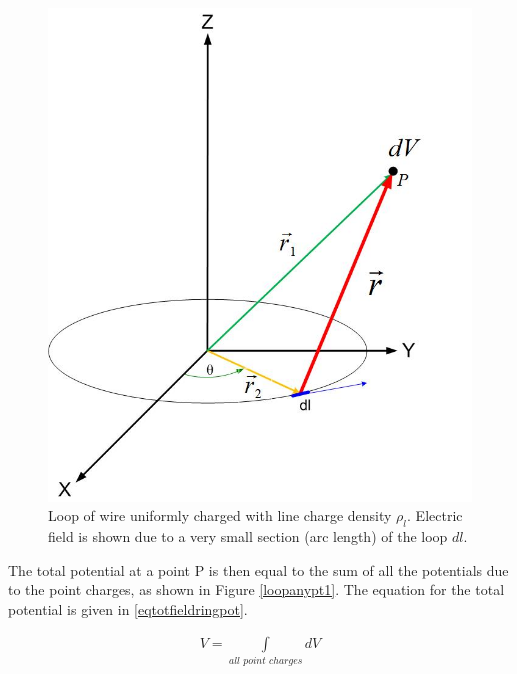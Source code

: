 \documentclass{ximera}
\begin{document}
\begin{figure}[!ht]
\begin{center}
\includegraphics[scale=0.3]{../jpg/Charge_Distributionanypointpot.jpg}
\end{center}
\caption{Loop of wire uniformly charged with line charge density $\rho_l$. Electric field is shown due to a very small section (arc length) of the loop $dl$.}
\label{loopanyptf}
\end{figure}

The total potential at a point P is then equal to the sum of all the potentials due to the point charges, as shown in Figure \ref{loopanypt1}. The equation for the total potential is given in \ref{eqtotfieldringpot}. 

\begin{eqnarray}
V=\int\limits_{all \,\, point \,\, charges} dV \label{eqtotfieldringpot}
\end{eqnarray}
\end{document}

